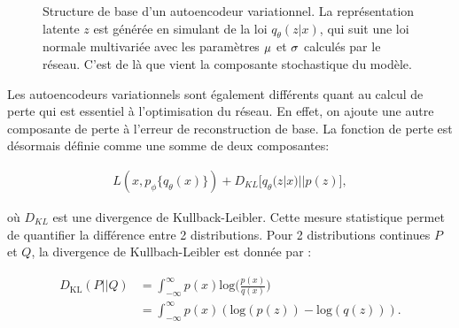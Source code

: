\begin{figure}[h]
	\caption{Structure de base d'un autoencodeur variationnel. La représentation latente $z$ est générée en simulant de la loi $q_{\theta}(z|x)$,  qui suit une loi normale multivariée avec les paramètres $\boldmath \mu$ et $\boldmath \sigma$ calculés par le réseau. C'est de là que vient la composante stochastique du modèle.}
	\label{fig:VAEstructure}
\end{figure}

Les autoencodeurs variationnels sont également différents quant au calcul de perte qui est essentiel à l'optimisation du réseau. En effet, on ajoute une autre composante de perte à l'erreur de reconstruction de base. La fonction de perte est désormais définie comme une somme de deux composantes:

\begin{gather}  \label{eq:loss_vae}
L(x, p_\phi\{q_\theta(x)\}) + D_{KL}\big[q_\theta(z|x) || p(z)\big],
\end{gather}


où $D_{KL}$ est une divergence de Kullback-Leibler. Cette mesure statistique permet de quantifier la différence entre 2 distributions. Pour 2 distributions continues $P$ et $Q$, la divergence de Kullbach-Leibler est donnée par :

\begin{equation}  \label{eq:kl}
	\begin{aligned}
		D_{\text{KL}}(P || Q) &= \int_{-\infty}^{\infty} p(x) \text{log} \Big(\frac{p(x)}{q(x)}\Big)  \\
		 &= \int_{-\infty}^{\infty} p(x) (\text{log}(p(z)) - \text{log}(q(z))).
	\end{aligned}
\end{equation}


